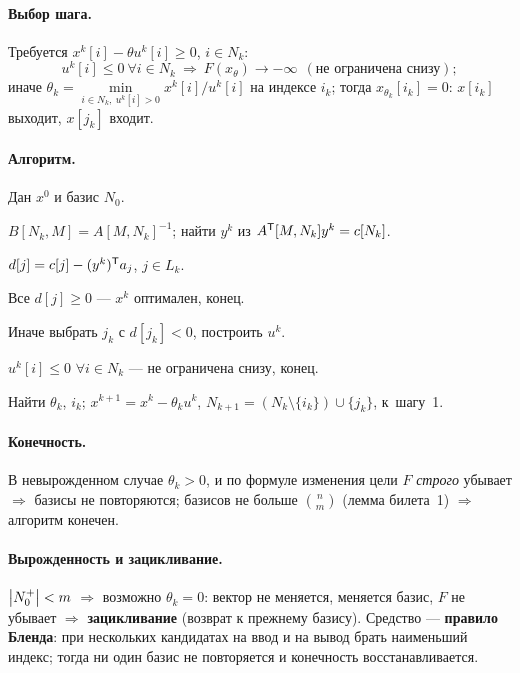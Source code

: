 \paragraph{Выбор шага.}
Требуется $x^k[i] - \theta u^k[i] \ge 0$, $i \in N_k$:
\[
  u^k[i] \le 0 \ \forall i \in N_k \ \Rightarrow\ F(x_\theta) \to -\infty
  \ \ (\text{не ограничена снизу});
\]
иначе $\theta_k = \min\limits_{i \in N_k,\ u^k[i]>0} x^k[i]/u^k[i]$ на
индексе $i_k$; тогда $x_{\theta_k}[i_k] = 0$: $x[i_k]$ выходит, $x[j_k]$ входит.

\paragraph{Алгоритм.}
Дан $x^0$ и базис $N_0$.
\begin{csteps}
  \item $B[N_k,M] = A[M,N_k]^{-1}$; найти $y^k$ из $A^{\mathsf{T}}[M,N_k]y^k = c[N_k]$.
  \item $d[j] = c[j] - (y^k)^{\mathsf{T}} a_j$, $j \in L_k$.
  \item Все $d[j] \ge 0$ — $x^k$ оптимален, конец.
  \item Иначе выбрать $j_k$ с $d[j_k] < 0$, построить $u^k$.
  \item $u^k[i] \le 0$ $\forall i \in N_k$ — не ограничена снизу, конец.
  \item Найти $\theta_k$, $i_k$; $x^{k+1} = x^k - \theta_k u^k$,
        $N_{k+1} = (N_k \setminus \{i_k\}) \cup \{j_k\}$, к~шагу~1.
\end{csteps}

\paragraph{Конечность.}
В невырожденном случае $\theta_k > 0$, и по формуле изменения цели
$F$ \emph{строго} убывает $\Rightarrow$ базисы не повторяются; базисов не
больше $\binom{n}{m}$ (лемма билета~1) $\Rightarrow$ алгоритм конечен.

\paragraph{Вырожденность и зацикливание.}
$\left\lvert N_0^{+} \right\rvert < m$ $\Rightarrow$ возможно $\theta_k = 0$: вектор не меняется,
меняется базис, $F$ не убывает $\Rightarrow$ \textbf{зацикливание} (возврат к
прежнему базису). Средство — \textbf{правило Бленда}: при нескольких
кандидатах на ввод и на вывод брать наименьший индекс; тогда ни один базис не
повторяется и конечность восстанавливается.


